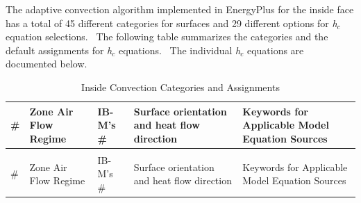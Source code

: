 The adaptive convection algorithm implemented in EnergyPlus for the inside face has a total of 45 different categories for surfaces and 29 different options for \emph{h\(_{c}\)} equation selections.~ The following table summarizes the categories and the default assignments for \emph{h\(_{c}\)} equations.~ The individual \emph{h\(_{c}\)} equations are documented below.

{\scriptsize
\begin{longtable}[c]{p{0.25in}p{1.25in}p{0.25in}p{1.5in}p{2.5in}}

\caption{Inside Convection Categories and Assignments \label{table:table-13.-inside-convection-categories}} \tabularnewline
\toprule 
\# & Zone Air Flow Regime & IB-M's \# & Surface orientation and heat flow direction & Keywords for Applicable Model Equation Sources \tabularnewline
\midrule
\endfirsthead

\caption[]{Inside Convection Categories and Assignments} \tabularnewline
\toprule 
\# & Zone Air Flow Regime & IB-M's \# & Surface orientation and heat flow direction & Keywords for Applicable Model Equation Sources \tabularnewline
\midrule
\endhead


\end{longtable}}
